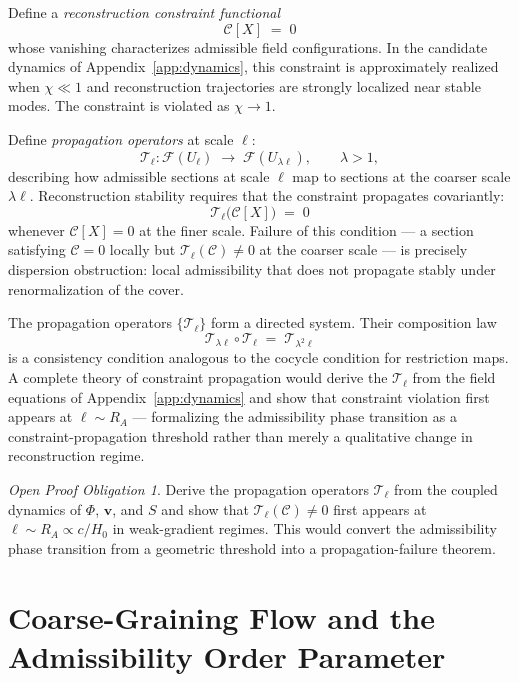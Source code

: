 \documentclass[11pt, a4paper]{article}
\theoremstyle{plain}
\theoremstyle{definition}
\theoremstyle{remark}
\newtheorem{obligation}[theorem]{Open Proof Obligation}
\newcommand{\RA}{R_{\!A}}
\newcommand{\sheaf}{\mathcal{F}}
\begin{document}
Define a \emph{reconstruction constraint functional}
\[
  \mathcal{C}[X] \;=\; 0
\]
whose vanishing characterizes admissible field configurations. In the candidate
dynamics of Appendix~\ref{app:dynamics}, this constraint is approximately realized
when $\chi \ll 1$ and reconstruction trajectories are strongly localized near stable
modes. The constraint is violated as $\chi \to 1$.

Define \emph{propagation operators} at scale $\ell$:
\[
  \mathcal{T}_\ell \colon \sheaf(U_\ell) \;\longrightarrow\; \sheaf(U_{\lambda\ell}),
  \qquad \lambda > 1,
\]
describing how admissible sections at scale $\ell$ map to sections at the coarser
scale $\lambda\ell$. Reconstruction stability requires that the constraint propagates
covariantly:
\[
  \mathcal{T}_\ell\bigl(\mathcal{C}[X]\bigr) \;=\; 0
\]
whenever $\mathcal{C}[X] = 0$ at the finer scale. Failure of this condition --- a
section satisfying $\mathcal{C} = 0$ locally but $\mathcal{T}_\ell(\mathcal{C}) \neq
0$ at the coarser scale --- is precisely dispersion obstruction: local admissibility
that does not propagate stably under renormalization of the cover.

The propagation operators $\{\mathcal{T}_\ell\}$ form a directed system. Their
composition law
\[
  \mathcal{T}_{\lambda\ell} \circ \mathcal{T}_\ell \;=\; \mathcal{T}_{\lambda^2\ell}
\]
is a consistency condition analogous to the cocycle condition for restriction maps. A
complete theory of constraint propagation would derive the $\mathcal{T}_\ell$ from the
field equations of Appendix~\ref{app:dynamics} and show that constraint violation
first appears at $\ell \sim \RA$ --- formalizing the admissibility phase transition as
a constraint-propagation threshold rather than merely a qualitative change in
reconstruction regime.

\begin{obligation}
\label{obl:constraint}
Derive the propagation operators $\mathcal{T}_\ell$ from the coupled dynamics of
$\Phi$, $\mathbf{v}$, and $S$ and show that $\mathcal{T}_\ell(\mathcal{C}) \neq 0$
first appears at $\ell \sim \RA \propto c/H_0$ in weak-gradient regimes. This would
convert the admissibility phase transition from a geometric threshold into a
propagation-failure theorem.
\end{obligation}
\section{Coarse-Graining Flow and the Admissibility Order Parameter}
\label{app:flow}
\end{document}
